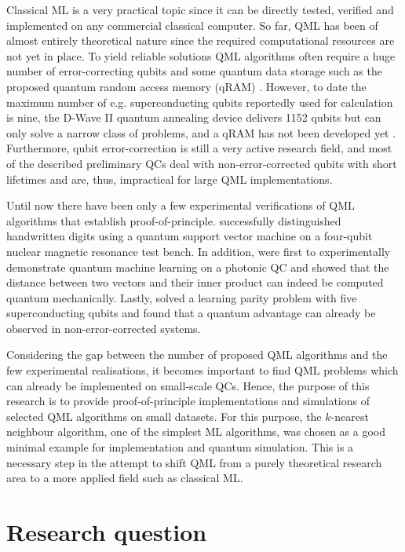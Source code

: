 Classical ML is a very practical topic since it can be directly tested, verified and implemented on any commercial classical computer. So far, QML has been of almost entirely theoretical nature since the required computational resources are not yet in place. To yield reliable solutions QML algorithms often require a huge number of error-correcting qubits and some quantum data storage such as the proposed quantum random access memory (qRAM) \cite{qRAM}. However, to date the maximum number of e.g. superconducting qubits reportedly used for calculation is nine, the D-Wave II quantum annealing device delivers 1152 qubits but can only solve a narrow class of problems, and a qRAM has not been developed yet \cite{hydrogensimulation, dwave2}. Furthermore, qubit error-correction is still a very active research field, and most of the described preliminary QCs deal with non-error-corrected qubits with short lifetimes and are, thus, impractical for large QML implementations.

Until now there have been only a few experimental verifications of QML algorithms that establish proof-of-principle.  successfully distinguished handwritten digits using a quantum support vector machine on a four-qubit nuclear magnetic resonance test bench. In addition,  were first to experimentally demonstrate quantum machine learning on a photonic QC and showed that the distance between two vectors and their inner product can indeed be computed quantum mechanically. Lastly,  solved a learning parity problem with five superconducting qubits and found that a quantum advantage can already be observed in non-error-corrected systems.

Considering the gap between the number of proposed QML algorithms and the few experimental realisations, it becomes important to find QML problems which can already be implemented on small-scale QCs. Hence, the purpose of this research is to provide proof-of-principle implementations and simulations of selected QML algorithms on small datasets. For this purpose, the $k$-nearest neighbour algorithm, one of the simplest ML algorithms, was chosen as a good minimal example for implementation and quantum simulation. This is a necessary step in the attempt to shift QML from a purely theoretical research area to a more applied field such as classical ML.

\section{Research question}
\label{sec:researchquestion}


